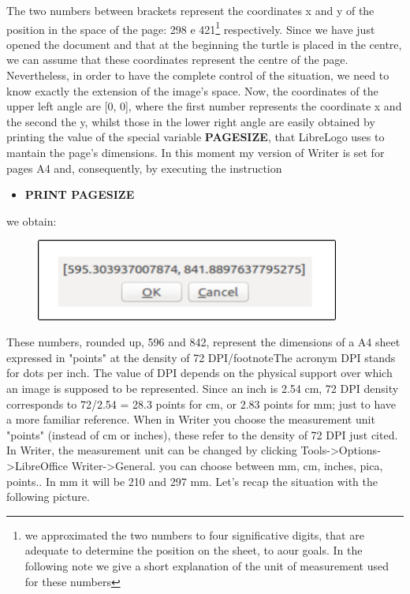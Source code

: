 The two numbers between brackets represent the coordinates x and y of the position in the space of the page: 298 e 421\footnote{we approximated the two numbers to four significative digits, that are adequate to determine the position on the sheet, to aour goals.
In the following note we give a short explanation of the unit of measurement used for these numbers} respectively. Since we have just opened the document and that at the beginning the turtle is placed in the centre, we can assume that these coordinates represent the centre of the page. Nevertheless, in order to have the complete control of the situation, we need to know exactly the extension of the image's space. Now, the coordinates of the upper left angle are [0, 0], where the first number represents the coordinate x and the second the y, whilst those in the lower right angle are easily obtained by printing the value of the special variable \textbf{PAGESIZE}, that LibreLogo uses to mantain the page's dimensions. In this moment my version of Writer is set for pages A4 and, consequently, by executing the instruction

\vskip 1cm

\begin{scriptsize}
\begin{minipage}{1.0\textwidth}
\begin{itemize}[itemsep=-3pt,parsep=2pt]
\item[] \textbf{PRINT PAGESIZE}
\end{itemize}
\end{minipage}
\end{scriptsize}

\vskip 1cm

we obtain:

\vskip 1cm

\begin{figure}[H]
   \centering
   \includegraphics[width=10.0cm,trim=8 8 8 8,clip]{./images/disegnare/disegnare-29.png}
   \label{dis-29}
\end{figure}

\vskip 1cm

These numbers, rounded up, 596 and 842, represent the dimensions of a A4 sheet expressed in "points" at the density of 72 DPI/footnote{The acronym DPI stands for dots per inch. The value of DPI depends on the physical support over which an image is supposed to be represented.
Since an inch is 2.54 cm, 72 DPI density corresponds to 72/2.54 = 28.3 points for cm, or 2.83 points for mm; just to have a more familiar reference. When in Writer you choose the measurement unit "points" (instead of cm or inches), these refer to the density of 72 DPI just cited. In Writer, the measurement unit can be changed by clicking Tools->Options->LibreOffice Writer->General. you can choose between mm, cm, inches, pica, points.}. In mm it will be 210 and 297 mm. Let's recap the situation with the following picture.

